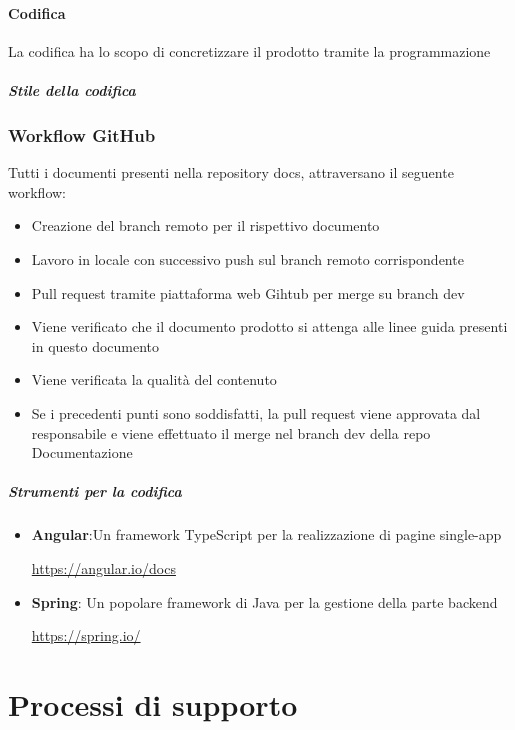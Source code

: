\documentclass[12pt]{article}
\begin{document}
\paragraph{Codifica}
La codifica ha lo scopo di concretizzare il prodotto tramite la programmazione

\subparagraph{Stile della codifica}

\subsubsection{Workflow GitHub}
Tutti i documenti presenti nella repository docs, attraversano il seguente workflow:


\begin{itemize}
    \item Creazione del branch remoto per il rispettivo documento
    \item Lavoro in locale con successivo push sul branch remoto corrispondente
    \item Pull request tramite piattaforma web Gihtub per merge su branch dev
    \item Viene verificato che il documento prodotto si attenga alle linee guida presenti in questo documento
    \item Viene verificata la qualità del contenuto 
    \item Se i precedenti punti sono soddisfatti, la pull request viene approvata dal responsabile e viene effettuato il merge nel branch dev della repo Documentazione
\end{itemize}

\subparagraph{Strumenti per la codifica}
\begin{itemize}
    \item \textbf{Angular}:Un framework TypeScript per la realizzazione di pagine single-app\\ 
    \begin{center}
        \url{https://angular.io/docs}
    \end{center}
    \item \textbf{Spring}: Un popolare framework di Java per la gestione della parte backend 
    \begin{center}
        \url{https://spring.io/}
    \end{center}
\end{itemize}
\section{Processi di supporto}
\end{document}
